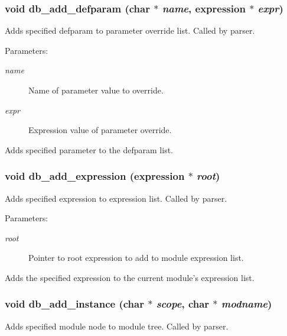 \subsubsection{\setlength{\rightskip}{0pt plus 5cm}void db\_\-add\_\-defparam (char $\ast$ {\em name}, {\bf expression} $\ast$ {\em expr})}\label{db_8h_a7}


Adds specified defparam to parameter override list. Called by parser. 

\begin{Desc}
\item[Parameters:]
\begin{description}
\item[{\em name}]Name of parameter value to override. \item[{\em expr}]Expression value of parameter override.\end{description}
\end{Desc}
Adds specified parameter to the defparam list. 
\subsubsection{\setlength{\rightskip}{0pt plus 5cm}void db\_\-add\_\-expression ({\bf expression} $\ast$ {\em root})}\label{db_8h_a12}


Adds specified expression to expression list. Called by parser. 

\begin{Desc}
\item[Parameters:]
\begin{description}
\item[{\em root}]Pointer to root expression to add to module expression list.\end{description}
\end{Desc}
Adds the specified expression to the current module's expression list. 
\subsubsection{\setlength{\rightskip}{0pt plus 5cm}void db\_\-add\_\-instance (char $\ast$ {\em scope}, char $\ast$ {\em modname})}\label{db_8h_a2}


Adds specified module node to module tree. Called by parser. 

